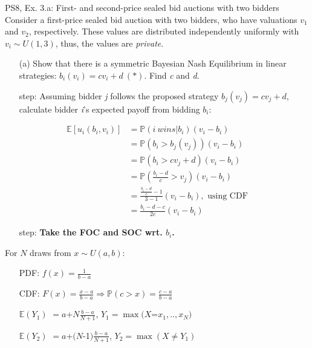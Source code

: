 \begin{frame}{PS8, Ex. 3.a: First- and second-price sealed bid auctions with two bidders}
    Consider a first-price sealed bid auction with two bidders, who have valuations $v_1$ and $v_2$, respectively. These values are distributed independently uniformly with $v_i\sim U(1,3)$, thus, the values are \textit{private}.
    \vspace{-4pt}
    \begin{itemize}
      \item[(a)] Show that there is a symmetric Bayesian Nash Equilibrium in linear strategies: $b_i(v_i) = cv_i + d\ (*)$. Find \textit{c} and \textit{d}.
    \end{itemize}
    \vspace{-8pt}
    \begin{multicols}{2}
      \begin{itemize}
        \item[\nth{1} step:] Assuming bidder \textit{j} follows the proposed strategy $b_j(v_j) = cv_j + d$, calculate bidder \textit{i}'s expected payoff from bidding $b_i$:
      \end{itemize}
      \vspace{-4pt}
      \begin{align*}
        \mathbb{E}[u_i(b_i,v_i)]&=\mathbb{P}(i\ wins|b_i)(v_i-b_i)\\
                                &=\mathbb{P}(b_i>b_j(v_j))(v_i-b_i)\\
                                &=\mathbb{P}(b_i>cv_j+d)(v_i-b_i)\\
                                &=\mathbb{P}\left(\frac{b_i-d}{c}>v_j\right)(v_i-b_i)\\
                                &=\frac{\frac{b_i-d}{c}-1}{3-1}(v_i-b_i),\text{ using CDF}\\
                                &=\frac{b_i-d-c}{2c}(v_i-b_i)
      \end{align*}
      \vspace{-10pt}
      \begin{itemize}
        \item[\nth{2} step:] \textbf{Take the FOC and SOC wrt. $b_i$.}
      \end{itemize}
      \vfill\null\columnbreak
      For $N$ draws from $x\sim U(a, b):$
      \vspace{-6pt}
      \begin{enumerate}
        \item[PDF:] $f(x)=\frac{1}{b-a}$
        \item[CDF:] $F(x)=\frac{x-a}{b-a}\Rightarrow\mathbb{P}(c>x)=\frac{c-a}{b-a}$
        \item[$\mathbb{E}(Y_1)$] $=a$+$N\frac{b-a}{N+1}$, $Y_1=\max(X$=$x_1,..,x_N)$
        \item[$\mathbb{E}(Y_2)$] $=a$+$(N$-1$)\frac{b-a}{N+1}$, $Y_2=\max(X\neq Y_1)$
      \end{enumerate}
      \vfill\null
    \end{multicols}
\end{frame}
